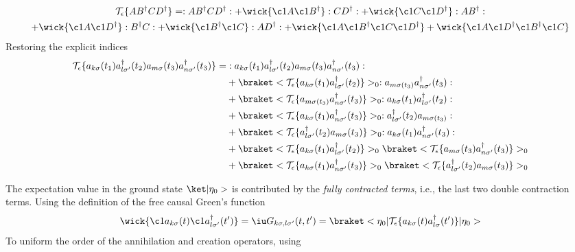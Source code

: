 \begin{solution}
\begin{enumext}
\begin{multline*}
      \mathcal T_\epsilon\{AB^\dagger CD^\dagger\}
    = :AB^\dagger CD^\dagger:
    + \wick{\c1A\c1B^\dagger}:CD^\dagger:
    + \wick{\c1C\c1D^\dagger} :AB^\dagger:\\
    + \wick{\c1A\c1D^\dagger} :B^\dagger C:
    + \wick{\c1B^\dagger\c1C} :AD^\dagger:
    + \wick{\c1A\c1B^\dagger\c1C\c1D^\dagger}
    + \wick{\c1A\c1D^\dagger\c1B^\dagger\c1C}
    \end{multline*}
    Restoring the explicit indices
    \begin{align*}
      \mathcal T_\epsilon \{a_{k\sigma}(t_1) a_{l\sigma'}^\dagger(t_2)
                            a_{m\sigma}(t_3) a_{n\sigma'}^\dagger(t_3)\}
  = &:a_{k\sigma}(t_1) a_{l\sigma'}^\dagger(t_2)
      a_{m\sigma}(t_3) a_{n\sigma'}^\dagger(t_3):\\
    & + \braket<\mathcal T_\epsilon\{
          a_{k\sigma}(t_1) a_{l\sigma'}^\dagger(t_2)\}>_0
         :a_{m\sigma(t_3)} a_{n\sigma'}^\dagger(t_3):\\
    & + \braket<\mathcal T_\epsilon\{
          a_{m\sigma(t_3)} a_{n\sigma'}^\dagger(t_3)\}>_0
         :a_{k\sigma}(t_1) a_{l\sigma'}^\dagger(t_2):\\
    & + \braket<\mathcal T_\epsilon\{
          a_{k\sigma}(t_1) a_{n\sigma'}^\dagger(t_3)\}>_0
         :a_{l\sigma'}^\dagger(t_2) a_{m\sigma(t_3)}:\\
    & + \braket<\mathcal T_\epsilon\{
          a_{l\sigma'}^\dagger(t_2)a_{m\sigma}(t_3)\}>_0
         :a_{k\sigma}(t_1) a_{n\sigma'}^\dagger(t_3):\\
    & + \braket<\mathcal T_\epsilon\{
          a_{k\sigma}(t_1) a_{l\sigma'}^\dagger(t_2)\}>_0
        \braket<\mathcal T_\epsilon\{
          a_{m\sigma}(t_3) a_{n\sigma'}^\dagger(t_3)\}>_0\\
    & + \braket<\mathcal T_\epsilon\{
          a_{k\sigma}(t_1) a_{n\sigma'}^\dagger(t_3)\}>_0
        \braket<\mathcal T_\epsilon\{
          a_{l\sigma'}^\dagger(t_2) a_{m\sigma}(t_3)\}>_0
    \end{align*}
    \item The expectation value in the ground state $\ket|\eta_0>$ is
    contributed by the \emph{fully contracted terms}, i.e., the last two double
    contraction terms. Using the definition of the free causal Green's function
    \[
      \wick{\c1 a_{k\sigma}(t)\c1 a_{l\sigma'}^\dagger(t')}
    = \iu G_{k\sigma,l\sigma'}(t,t')
    = \braket<\eta_0|\mathcal T_\epsilon
        \{a_{k\sigma}(t) a_{l\sigma}^\dagger(t')\}|\eta_0>
    \]
    To uniform the order of the annihilation and creation operators, using

\end{enumext}
\end{solution}
